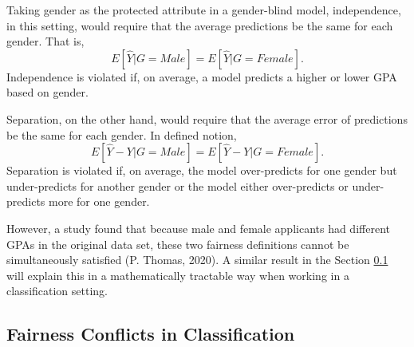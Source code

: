 \documentclass[12pt, twoside]{amherstthesis}
\begin{document}
Taking gender as the protected attribute in a gender-blind model, independence, in this setting, would require that the average predictions be the same for each gender. That is,
\begin{equation}
\label{ch1eq12}
E[\hat{Y} | G = Male] = E[\hat{Y} | G = Female].
\end{equation}
Independence is violated if, on average, a model predicts a higher or lower GPA based on gender.

Separation, on the other hand, would require that the average error of predictions be the same for each gender. In defined notion,
\begin{equation}
\label{ch1eq13}
E[\hat{Y} - Y | G = Male] = E[\hat{Y} - Y| G = Female].
\end{equation}
Separation is violated if, on average, the model over-predicts for one gender but under-predicts for another gender or the model either over-predicts or under-predicts more for one gender.

However, a study found that because male and female applicants had different GPAs in the original data set, these two fairness definitions cannot be simultaneously satisfied (P. Thomas, 2020). A similar result in the Section \ref{class-conflict} will explain this in a mathematically tractable way when working in a classification setting.

\hypertarget{class-conflict}{%
\subsection{Fairness Conflicts in Classification}\label{class-conflict}}
\end{document}
